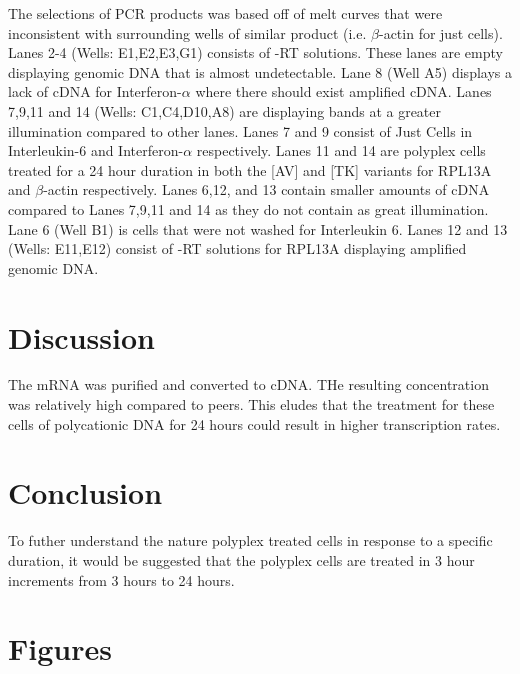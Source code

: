 \documentclass[journal, a4paper]{IEEEtran}
\begin{document}
    The selections of PCR products was based off of melt curves that were inconsistent with
    surrounding wells of similar product (i.e. $\beta$-actin for just cells).
    Lanes 2-4 (Wells: E1,E2,E3,G1) consists of -RT solutions. These lanes are empty displaying
    genomic DNA that is almost undetectable. Lane 8 (Well A5) displays a lack of cDNA
    for Interferon-$\alpha$ where there should exist amplified cDNA. Lanes  7,9,11 and 14
    (Wells: C1,C4,D10,A8) are displaying bands at a greater illumination compared to other lanes.
    Lanes 7 and 9 consist of Just Cells in Interleukin-6 and Interferon-$\alpha$ respectively.
    Lanes 11 and 14 are polyplex cells treated for a 24 hour duration in both the [AV] and [TK] variants
    for RPL13A and $\beta$-actin respectively.
    Lanes 6,12, and 13 contain smaller amounts of cDNA compared to Lanes 7,9,11 and 14 as they do not contain
    as great illumination.
    Lane 6 (Well B1) is cells that were not washed for Interleukin 6.
    Lanes 12 and 13 (Wells: E11,E12) consist of -RT solutions for RPL13A displaying amplified genomic DNA.
\section{Discussion}

The mRNA was purified and converted to cDNA. THe resulting concentration was relatively high compared to peers. This eludes that the
treatment for these cells of polycationic DNA for 24 hours could result in higher transcription rates.

\section{Conclusion}

To futher understand the nature polyplex treated cells in response to a specific duration,
it would be suggested that the polyplex cells are treated in 3 hour increments from 3 hours to 24 hours.


\section{Figures}

\end{document}
